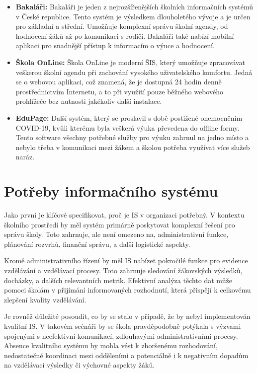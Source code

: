 \documentclass[FM,Proj]{tulthesis}
\begin{document}
\begin{samepage}
    \begin{itemize}
        \item \textbf{Bakaláři:} Bakaláři je jeden z nejrozšířenějších školních informačních 
        systémů v České republice. Tento systém je výsledkem dlouholetého vývoje a je určen pro 
        základní a střední. Umožňuje komplexní správu školní agendy, od hodnocení žáků až po 
        komunikaci s rodiči. Bakaláři také nabízí mobilní aplikaci pro snadnější přístup 
        k informacím o výuce a hodnocení.

        \item \textbf{Škola OnLine:} Škola OnLine je moderní ŠIS, 
        který umožňuje zpracovávat veškerou školní agendu při zachování vysokého uživatelského 
        komfortu. Jedná se o webovou aplikaci, což znamená, že je dostupná 24 hodin denně 
        prostřednictvím Internetu, a to při využití pouze běžného webového prohlížeče 
        bez nutnosti jakékoliv další instalace.

        \item \textbf{EduPage:} Další systém, který se proslavil s době postižené onemocněním 
        COVID-19, kvůli kterému byla veškerá výuka převedena do offline formy. Tento software
        všechny potřebné služby pro výuku zahrnul na jedno místo a nebylo třeba v komunikaci 
        mezi žákem a školou potřeba využívat více služeb naráz.

    \end{itemize}
\end{samepage}

\section{Potřeby informačního systému}
Jako první je klíčové specifikovat, proč je IS 
v organizaci potřebný. V kontextu školního prostředí by měl systém 
primárně poskytovat komplexní řešení pro správu školy. Toto zahrnuje, 
ale není omezeno na, administrativní funkce, plánování rozvrhů, 
finanční správu, a další logistické aspekty.

Kromě administrativního řízení by měl IS nabízet 
pokročilé funkce pro evidence vzdělávání a vzdělávací procesy. 
Toto zahrnuje sledování žákovských výsledků, docházky, a dalších 
relevantních metrik. Efektivní analýza těchto dat může pomoci školám 
v přijímání informovaných rozhodnutí, která přispějí k celkovému 
zlepšení kvality vzdělávání.

Je rovněž důležité posoudit, co by se stalo v případě, že by nebyl 
implementován kvalitní IS. V takovém scénáři by se 
škola pravděpodobně potýkala s výzvami spojenými s neefektivní 
komunikací, zdlouhavými administrativními procesy. Absence kvalitního 
systému by mohla vést k zhoršenému rozhodování, nedostatečné 
koordinaci mezi odděleními a potenciálně i k negativním dopadům 
na vzdělávací výsledky či výchovné aspekty žáků.
\end{document}
